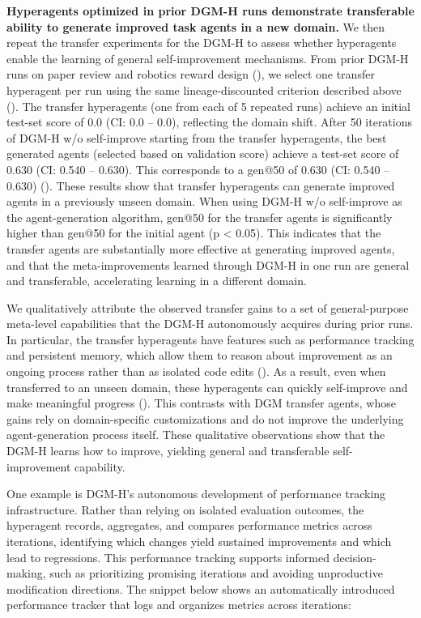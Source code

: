 \documentclass[]{fairmeta}
\begin{document}
\textbf{Hyperagents optimized in prior DGM-H runs demonstrate transferable ability to generate improved task agents in a new domain.}
We then repeat the transfer experiments for the DGM-H to assess whether hyperagents enable the learning of general self-improvement mechanisms. From prior DGM-H runs on paper review and robotics reward design (), we select one transfer hyperagent per run using the same lineage-discounted criterion described above (). The transfer hyperagents (one from each of 5 repeated runs) achieve an initial test-set score of 0.0 (CI: 0.0 -- 0.0), reflecting the domain shift. After 50 iterations of DGM-H w/o self-improve starting from the transfer hyperagents, the best generated agents (selected based on validation score) achieve a test-set score of 0.630 (CI: 0.540 -- 0.630). This corresponds to a gen@50 of 0.630 (CI: 0.540 -- 0.630) (). These results show that transfer hyperagents can generate improved agents in a previously unseen domain. When using DGM-H w/o self-improve as the agent-generation algorithm, gen@50 for the transfer agents is significantly higher than gen@50 for the initial agent (p < 0.05). This indicates that the transfer agents are substantially more effective at generating improved agents, and that the meta-improvements learned through DGM-H in one run are general and transferable, accelerating learning in a different domain.

We qualitatively attribute the observed transfer gains to a set of general-purpose meta-level capabilities that the DGM-H autonomously acquires during prior runs. In particular, the transfer hyperagents have features such as performance tracking and persistent memory, which allow them to reason about improvement as an ongoing process rather than as isolated code edits (). As a result, even when transferred to an unseen domain, these hyperagents can quickly self-improve and make meaningful progress (). This contrasts with DGM transfer agents, whose gains rely on domain-specific customizations and do not improve the underlying agent-generation process itself. These qualitative observations show that the DGM-H learns how to improve, yielding general and transferable self-improvement capability.

One example is DGM-H's autonomous development of performance tracking infrastructure. Rather than relying on isolated evaluation outcomes, the hyperagent records, aggregates, and compares performance metrics across iterations, identifying which changes yield sustained improvements and which lead to regressions. This performance tracking supports informed decision-making, such as prioritizing promising iterations and avoiding unproductive modification directions. The snippet below shows an automatically introduced performance tracker that logs and organizes metrics across iterations:

\end{document}
